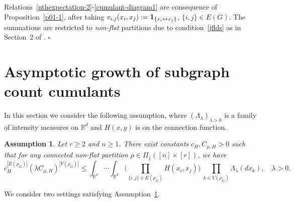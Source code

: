 \documentclass[12pt]{article}
\newcommand{\R}{\mathbb{R}}
\newcommand{\bone}{{\bf 1}}
\newtheorem{assumption}[prop]{Assumption}
\def\real{{\mathord{\mathbb R}}}
\newenvironment{Proof}{\removelastskip\par\medskip
\noindent{\em Proof.} \rm}{\penalty-20\null\hfill$\square$\par\medbreak}
\numberwithin{equation}{section}
\begin{document}
\begin{Proof}
 Relations~\eqref{nthexpectation-2}-\eqref{cumulant-diagram1}
 are consequence of Proposition~\ref{p01-1}, after taking
  $v_{i,j}(x_i,x_j):=\bone_{\{x_i\leftrightarrow x_j\}}$,
  $\{i,j\}\in E(G)$.
  The summations are restricted to {\em non-flat} partitions
  due to condition~\eqref{jflds} as in Section~2 of \cite{prkhp}. 
\end{Proof}
\section{Asymptotic growth of subgraph count cumulants}
\label{s6}
\noindent 
In this section we consider the following assumption,
where $(\Lambda_\lambda)_{\lambda >0}$ is a family 
of intensity measures on $\real^d$ and $H(x,y)$ is
on the connection function.
\begin{assumption}
\label{a61} 
 Let $r\geq 2$ and $n \geq 1$.
 There exist constants $c_H, C_{\mu , H} > 0$
 such that 
 for any connected non-flat partition 
 $\rho \in \Pi_{\widehat{1}} ( [n] \times [r])$, we have 
\begin{equation}
\label{integ-connecting3}
  c_H^{|E(\rho_G)|} ( \lambda C_{\mu , H} )^{|V(\rho_G)|}
\leq     \int_{\R^d}\cdots\int_{\R^d}
\Bigg(
\prod_{\{i,j\}\in E(\rho_G) }H(x_i,x_j)
\Bigg)
\
\prod_{k\in V(\rho_G) } \Lambda_\lambda (dx_k),
\quad \lambda >0. 
\end{equation}
\end{assumption}
 We consider two settings satisfying Assumption~\ref{a61}.

\vspace{-0.8cm}

\end{document}
